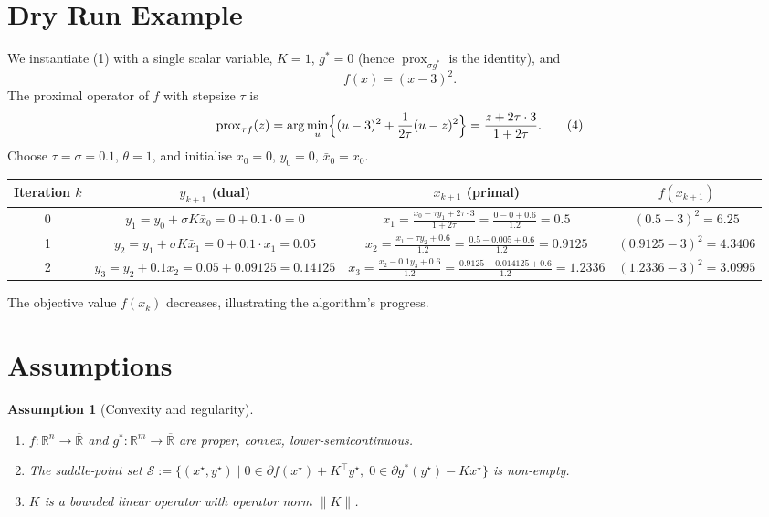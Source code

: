 \documentclass{article}
\newtheorem{assumption}{Assumption}
\newcommand{\prox}{\operatorname{prox}}
\newcommand{\R}{\mathbb{R}}
\begin{document}
\section*{Dry Run Example}
We instantiate (1) with a single scalar variable, $K=1$, $g^{*}=0$ (hence $\prox_{\sigma g^{*}}$ is the identity), and
\[
f(x)= (x-3)^{2}.
\]
The proximal operator of $f$ with stepsize $\tau$ is
\[
\prox_{\tau f}(z)=\arg\min_{u}\Bigl\{ (u-3)^{2}+ \frac{1}{2\tau}(u-z)^{2}\Bigr\}
          =\frac{z+2\tau\cdot 3}{1+2\tau}.
\tag{4}
\]
Choose $\tau=\sigma=0.1$, $\theta=1$, and initialise $x_{0}=0$, $y_{0}=0$, $\bar x_{0}=x_{0}$.

\begin{center}
\begin{tabular}{c|c|c|c}
Iteration $k$ & $y_{k+1}$ (dual) & $x_{k+1}$ (primal) & $f(x_{k+1})$ \\ \hline
0 & $y_{1}= y_{0}+ \sigma K\bar x_{0}=0+0.1\cdot0=0$ & 
$x_{1}= \frac{x_{0}-\tau y_{1}+ 2\tau\cdot3}{1+2\tau}
      =\frac{0-0+0.6}{1.2}=0.5$ & $(0.5-3)^{2}=6.25$ \\[4pt]
1 & $y_{2}= y_{1}+ \sigma K\bar x_{1}=0+0.1\cdot x_{1}=0.05$ &
$x_{2}= \frac{x_{1}-\tau y_{2}+0.6}{1.2}
      =\frac{0.5-0.005+0.6}{1.2}=0.9125$ & $(0.9125-3)^{2}=4.3406$ \\[4pt]
2 & $y_{3}= y_{2}+0.1 x_{2}=0.05+0.09125=0.14125$ &
$x_{3}= \frac{x_{2}-0.1 y_{3}+0.6}{1.2}
      =\frac{0.9125-0.014125+0.6}{1.2}=1.2336$ & $(1.2336-3)^{2}=3.0995$ 
\end{tabular}
\end{center}
The objective value $f(x_{k})$ decreases, illustrating the algorithm’s progress.

\newpage
\section*{Assumptions}
\begin{assumption}[Convexity and regularity]\label{ass:conv}
\begin{enumerate}[label=(\roman*)]
\item $f:\R^{n}\to\overline{\R}$ and $g^{*}:\R^{m}\to\overline{\R}$ are proper, convex, lower‑semicontinuous.
\item The saddle‑point set $\mathcal S:=\{(x^{\star},y^{\star})\mid 0\in\partial f(x^{\star})+K^{\!\top}y^{\star},
\;0\in\partial g^{*}(y^{\star})-Kx^{\star}\}$ is non‑empty.
\item $K$ is a bounded linear operator with operator norm $\|K\|$.
\end{enumerate}
\end{assumption}
\end{document}
